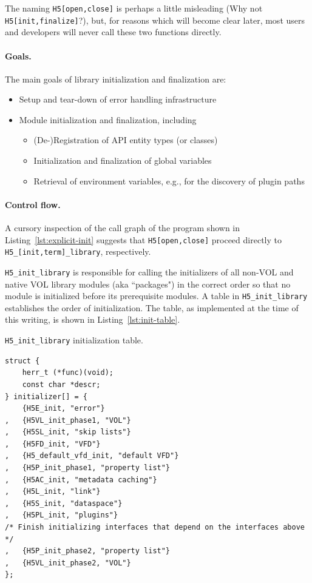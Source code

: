 The naming \texttt{H5[open,close]} is perhaps a little misleading (Why not \texttt{H5[init,finalize]}?), but, for reasons which will become clear later, most users and developers will never call these two functions directly.

\paragraph{Goals.} The main goals of library initialization and finalization are:

\begin{itemize}
    \item Setup and tear-down of error handling infrastructure
    \item Module initialization and finalization, including
    \begin{itemize}
        \item (De-)Registration of API entity types (or classes)
        \item Initialization and finalization of global variables
        \item Retrieval of environment variables, e.g., for the discovery of plugin paths
    \end{itemize}
\end{itemize}

\paragraph{Control flow.} A cursory inspection of the call graph of the program shown in Listing~\ref{lst:explicit-init} suggests that \texttt{H5[open,close]} proceed directly to \texttt{H5\_[init,term]\_library}, respectively.

\texttt{H5\_init\_library} is responsible for calling the initializers of all non-VOL and native VOL library modules (aka ``packages") in the correct order so that no module is initialized before its prerequisite modules. A table in \texttt{H5\_init\_library} establishes the order of initialization. The table, as implemented at the time of this writing, is shown in Listing~\ref{lst:init-table}.

\begin{listing}
\centering
\caption{\texttt{H5\_init\_library} initialization table.}
\label{lst:init-table}
\begin{verbatim}
struct {
    herr_t (*func)(void);
    const char *descr;
} initializer[] = {
    {H5E_init, "error"}
,   {H5VL_init_phase1, "VOL"}
,   {H5SL_init, "skip lists"}
,   {H5FD_init, "VFD"}
,   {H5_default_vfd_init, "default VFD"}
,   {H5P_init_phase1, "property list"}
,   {H5AC_init, "metadata caching"}
,   {H5L_init, "link"}
,   {H5S_init, "dataspace"}
,   {H5PL_init, "plugins"}
/* Finish initializing interfaces that depend on the interfaces above */
,   {H5P_init_phase2, "property list"}
,   {H5VL_init_phase2, "VOL"}
};
\end{verbatim}
\end{listing}

